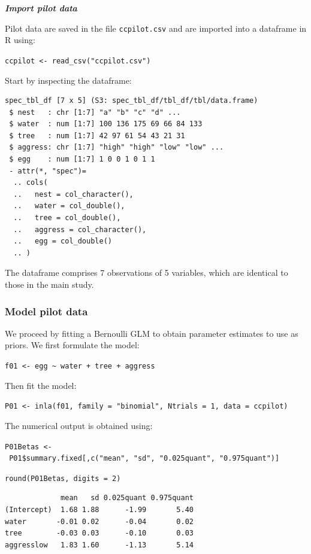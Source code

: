 \documentclass[
]{book}
\begin{document}
\emph{\textbf{Import pilot data}}

Pilot data are saved in the file \texttt{ccpilot.csv} and are imported into a dataframe in R using:

\texttt{ccpilot\ \textless{}-\ read\_csv("ccpilot.csv")}

Start by inspecting the dataframe:

\begin{verbatim}
spec_tbl_df [7 x 5] (S3: spec_tbl_df/tbl_df/tbl/data.frame)
 $ nest   : chr [1:7] "a" "b" "c" "d" ...
 $ water  : num [1:7] 100 136 175 69 66 84 133
 $ tree   : num [1:7] 42 97 61 54 43 21 31
 $ aggress: chr [1:7] "high" "high" "low" "low" ...
 $ egg    : num [1:7] 1 0 0 1 0 1 1
 - attr(*, "spec")=
  .. cols(
  ..   nest = col_character(),
  ..   water = col_double(),
  ..   tree = col_double(),
  ..   aggress = col_character(),
  ..   egg = col_double()
  .. )
\end{verbatim}

The dataframe comprises 7 observations of 5 variables, which are identical to those in the main study.

\hypertarget{model-pilot-data}{%
\subsubsection{Model pilot data}\label{model-pilot-data}}

We proceed by fitting a Bernoulli GLM to obtain parameter estimates to use as priors. We first formulate the model:

\texttt{f01\ \textless{}-\ egg\ \textasciitilde{}\ water\ +\ tree\ +\ aggress}

Then fit the model:

\texttt{P01\ \textless{}-\ inla(f01,\ family\ =\ "binomial",\ Ntrials\ =\ 1,\ data\ =\ ccpilot)}

The numerical output is obtained using:

\texttt{P01Betas\ \textless{}-\ P01\$summary.fixed{[},c("mean",\ "sd",\ "0.025quant",\ "0.975quant"){]}}

\texttt{round(P01Betas,\ digits\ =\ 2)}

\begin{verbatim}
             mean   sd 0.025quant 0.975quant
(Intercept)  1.68 1.88      -1.99       5.40
water       -0.01 0.02      -0.04       0.02
tree        -0.03 0.03      -0.10       0.03
aggresslow   1.83 1.60      -1.13       5.14
\end{verbatim}
\end{document}
